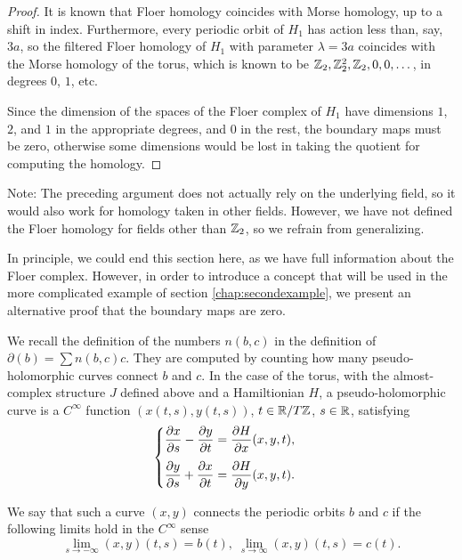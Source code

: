 \begin{proof}
It is known that Floer homology coincides with Morse homology, up to a shift in index. Furthermore, every periodic orbit of $H_1$ has action less than, say, $3a$, so the filtered Floer homology of $H_1$ with parameter $\lambda = 3a$ coincides with the Morse homology of the torus, which is known to be $\mathbb{Z}_2, \mathbb{Z}_2^2, \mathbb{Z}_2, 0, 0, \dots$, in degrees $0$, $1$, etc.

Since the dimension of the spaces of the Floer complex of $H_1$ have dimensions $1$, $2$, and $1$ in the appropriate degrees, and 0 in the rest, the boundary maps must be zero, otherwise some dimensions would be lost in taking the quotient for computing the homology.
\end{proof}

Note: The preceding argument does not actually rely on the underlying field, so it would also work for homology taken in other fields. However, we have not defined the Floer homology for fields other than $\mathbb{Z}_2$, so we refrain from generalizing.

In principle, we could end this section here, as we have full information about the Floer complex. However, in order to introduce a concept that will be used in the more complicated example of section \ref{chap:secondexample}, we present an alternative proof that the boundary maps are zero.

We recall the definition of the numbers $n(b,c)$ in the definition of $\partial(b) = \sum n(b,c) c$. They are computed by counting how many pseudo-holomorphic curves connect $b$ and $c$. In the case of the torus, with the almost-complex structure $J$ defined above and a Hamiltionian $H$, a pseudo-holomorphic curve is a $C^\infty$ function $(x(t,s), y(t,s))$, $t \in \mathbb{R} / T\mathbb{Z}$, $s \in \mathbb{R}$, satisfying
\begin{equation}\label{pseudoholomorphic}
\begin{cases}
\displaystyle \diffp x s - \diffp y t = \diffp H x(x,y,t),\\[1em]
\displaystyle \diffp y s + \diffp x t = \diffp H y(x,y,t).
\end{cases}
\end{equation}

We say that such a curve $(x,y)$ connects the periodic orbits $b$ and $c$ if the following limits hold in the $C^\infty$ sense
\begin{equation}
\lim_{s \to -\infty} (x,y)(t,s) = b(t), \; \lim_{s \to \infty} (x,y)(t,s) = c(t).
\end{equation}

